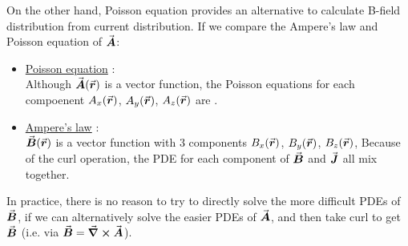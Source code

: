 \documentclass[class=article, crop=false, 12pt]{standalone}
\begin{document}
On the other hand, Poisson equation provides an alternative to calculate B-field distribution from current distribution.
If we compare the Ampere's law and Poisson equation of $\va*{A}$:
\begin{itemize}
    \item \ul{Poisson equation} : \\[1ex]
    Although $\va*{A}(\va*{r})$ is a vector function,
    the Poisson equations for each compoenent $A_x(\va*{r})$, $A_y(\va*{r})$, $A_z(\va*{r})$ 
    are .
    

    \item \ul{Ampere's law} :\\[1ex]
    $\va*{B}(\va*{r})$ is a vector function with 3 components $B_x(\va*{r})$, $B_y(\va*{r})$, $B_z(\va*{r})$,
    Because of the curl operation, 
    the PDE for each component of $\va*{B}$ and $\va*{J}$ all mix together.

\end{itemize}

In practice, there is no reason to try to directly solve the more difficult PDEs of $\va*{B}$,
if we can alternatively solve the easier PDEs of $\va*{A}$,
and then take curl to get $\va*{B}$ (i.e. via $\va*{B} = \curl \va*{A}$). 
\end{document}
